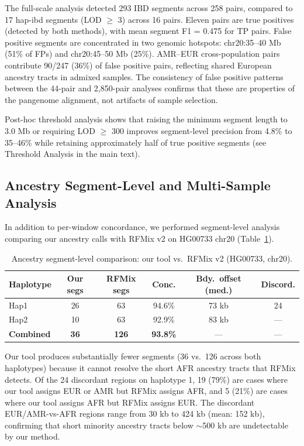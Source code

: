 \documentclass[11pt]{article}
\begin{document}
The full-scale analysis detected 293 IBD segments across 258 pairs, compared to 17 hap-ibd segments (LOD $\geq$ 3) across 16 pairs. Eleven pairs are true positives (detected by both methods), with mean segment F1 = 0.475 for TP pairs. False positive segments are concentrated in two genomic hotspots: chr20:35--40 Mb (51\% of FPs) and chr20:45--50 Mb (25\%). AMR--EUR cross-population pairs contribute 90/247 (36\%) of false positive pairs, reflecting shared European ancestry tracts in admixed samples. The consistency of false positive patterns between the 44-pair and 2,850-pair analyses confirms that these are properties of the pangenome alignment, not artifacts of sample selection.

Post-hoc threshold analysis shows that raising the minimum segment length to 3.0 Mb or requiring LOD $\geq$ 300 improves segment-level precision from 4.8\% to 35--46\% while retaining approximately half of true positive segments (see Threshold Analysis in the main text).

\subsection{Ancestry Segment-Level and Multi-Sample Analysis}
\label{sec:supp_ancestry_segments}

In addition to per-window concordance, we performed segment-level analysis comparing our ancestry calls with RFMix v2 on HG00733 chr20 (Table~\ref{tab:ancestry_segment_summary}).

\begin{table}[ht]
\centering
\caption{Ancestry segment-level comparison: our tool vs.\ RFMix v2 (HG00733, chr20).}
\label{tab:ancestry_segment_summary}
\small
\begin{tabular}{lccccc}
\hline
\textbf{Haplotype} & \textbf{Our segs} & \textbf{RFMix segs} & \textbf{Conc.} & \textbf{Bdy.\ offset (med.)} & \textbf{Discord.} \\
\hline
Hap1 & 26 & 63 & 94.6\% & 73 kb & 24 \\
Hap2 & 10 & 63 & 92.9\% & 83 kb & --- \\
\hline
\textbf{Combined} & \textbf{36} & \textbf{126} & \textbf{93.8\%} & --- & --- \\
\hline
\end{tabular}
\end{table}

Our tool produces substantially fewer segments (36 vs.\ 126 across both haplotypes) because it cannot resolve the short AFR ancestry tracts that RFMix detects. Of the 24 discordant regions on haplotype 1, 19 (79\%) are cases where our tool assigns EUR or AMR but RFMix assigns AFR, and 5 (21\%) are cases where our tool assigns AFR but RFMix assigns EUR. The discordant EUR/AMR-vs-AFR regions range from 30 kb to 424 kb (mean: 152 kb), confirming that short minority ancestry tracts below $\sim$500 kb are undetectable by our method.
\end{document}
